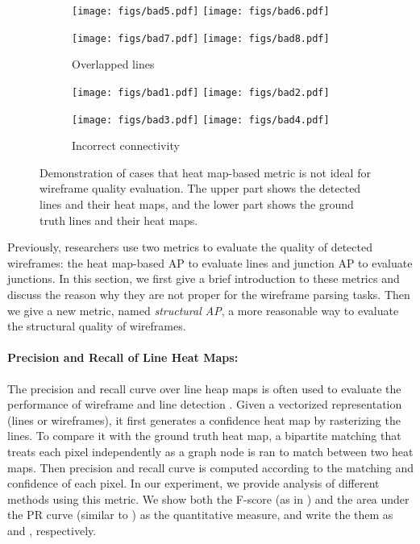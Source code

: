 \documentclass[10pt,twocolumn,letterpaper]{article}
\newcommand{\N}[1]{{\color{red}{#1}}}
\renewcommand{\N}[1]{{{#1}}}
\begin{document}
\begin{figure}[t]
    \centering
    \begin{subfigure}[b]{0.49\linewidth}
        \centering
        \texttt{[image: figs/bad5.pdf]} 
        \texttt{[image: figs/bad6.pdf]}
        
        \texttt{[image: figs/bad7.pdf]}
        \texttt{[image: figs/bad8.pdf]}
        \caption{Overlapped lines}
        \label{fig:duplicated-line}
    \end{subfigure}
    \begin{subfigure}[b]{0.49\linewidth}
        \centering
        \texttt{[image: figs/bad1.pdf]} 
        \texttt{[image: figs/bad2.pdf]}
        
        \texttt{[image: figs/bad3.pdf]}
        \texttt{[image: figs/bad4.pdf]}
        \caption{Incorrect connectivity}
        \label{fig:incorrect-connection}
    \end{subfigure}
    \caption{Demonstration of cases that heat map-based metric is not ideal for wireframe quality evaluation.  The upper part shows the detected lines and their heat maps, and the lower part shows the ground truth lines and their heat maps.}
    \label{fig:bad-metric}
\end{figure}

Previously, researchers use two metrics to evaluate the quality of detected wireframes: the heat map-based AP to evaluate lines and junction AP to evaluate junctions. In this section, we first give a brief introduction to these metrics and discuss the reason why they are not proper for the wireframe parsing tasks. Then we \N{give} a new metric, named {\em structural AP}, a more reasonable way to evaluate the structural quality of wireframes.


\paragraph{Precision and Recall of Line Heat Maps:} The precision and recall curve over line heap maps is often used to evaluate the performance of wireframe and line detection \cite{Huang:2018:LPW, xue2018learning}.  Given a vectorized representation (lines or wireframes), it first generates a confidence heat map by rasterizing the lines. To compare it with the ground truth heat map, a bipartite matching that treats each pixel independently as a graph node is ran to match between two heat maps. Then precision and recall curve is computed according to the matching and confidence of each pixel.  In our experiment, we provide analysis of different methods using this metric.  We show both the F-score (as in \cite{xue2018learning}) and the area under the PR curve (similar to \cite{everingham2010pascal}) as the quantitative measure, and write the them as   and , respectively.
\end{document}
